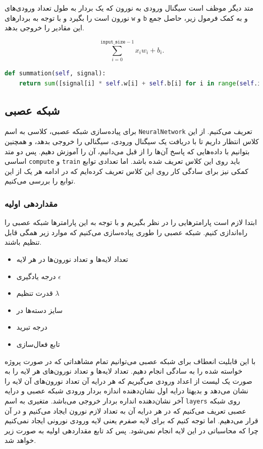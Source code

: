 \documentclass[a4paper, 12pt]{article}
\theoremstyle{definition}
\begin{document}
متد دیگر موظف است سیگنال ورودی به نورون که یک بردار به طول تعداد ورودی‌های نورون است را بگیرد و با توجه به بردارهای
\texttt{w}
و
\texttt{b}
و به کمک فرمول زیر، حاصل جمع این مقادیر را خروجی بدهد.

\[ \sum_{i = 0}^{\texttt{input\_size} - 1} x_i w_i + b_i. \]

\LTR
\begin{lstlisting}[language=Python]
def summation(self, signal):
    return sum([signal[i] * self.w[i] + self.b[i] for i in range(self.input_size)])
\end{lstlisting}
\RTL

\subsection{شبکه عصبی}
برای پیاده‌سازی شبکه عصبی، کلاسی به اسم
\texttt{NeuralNetwork}
تعریف می‌کنیم. از این کلاس انتظار داریم تا با دریافت یک سیگنال ورودی، سیگنالی را خروجی بدهد، و همچنین بتوانیم با داده‌هایی که پاسخ آن‌ها را از قبل می‌دانیم، آن را آموزش دهیم. پس دو متد اساسی
\texttt{compute}
و
\texttt{train}
باید روی این کلاس تعریف شده باشد. اما تعدادی توابع کمکی نیز برای سادگی کار روی این کلاس تعریف کرده‌ایم که در ادامه هر یک از این توابع را بررسی می‌کنیم.

\subsubsection{مقداردهی اولیه}
ابتدا لازم است پارامترهایی را در نظر بگیریم و با توجه به این پارامترها شبکه عصبی را راه‌اندازی کنیم. شبکه عصبی را طوری پیاده‌سازی می‌کنیم که موارد زیر همگی قابل تنظیم باشند.

\begin{itemize}
    \item تعداد لایه‌ها و تعداد نورون‌ها در هر لایه
    \item درجه یادگیری $\epsilon$
    \item قدرت تنظیم $\lambda$
    \item سایز دسته‌ها در 
    \item درجه تبرید
    \item تابع فعال‌سازی
\end{itemize}

با این قابلیت انعطاف برای شبکه عصبی می‌توانیم تمام مشاهداتی که در صورت پروژه خواسته شده را به سادگی انجام دهیم. تعداد لایه‌ها و تعداد نورون‌های هر لایه را به صورت یک لیست از اعداد ورودی می‌گیریم که هر درایه آن تعداد نورون‌های آن لایه را نشان می‌دهد و بدیهتا درایه اول نشان‌دهنده اندازه بردار ورودی شبکه عصبی و درایه آخر نشان‌دهنده انداره بردار خروجی می‌باشد. متغیری به اسم
\texttt{layers}
روی شبکه عصبی تعریف می‌کنیم که در هر درایه آن به تعداد لازم نورون ایجاد می‌کنیم و در آن قرار می‌دهیم. اما توجه کنیم که برای لایه صفرم یعنی لایه ورودی نورونی ایجاد نمی‌کنیم چرا که محاسباتی در این لایه انجام نمی‌شود. پس کد تابع مقداردهی اولیه به صورت زیر خواهد شد.
\end{document}

